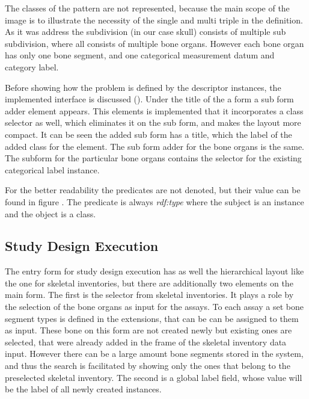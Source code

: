 
The classes of the pattern are not represented, because the main scope of the image is to illustrate the necessity of the single and multi triple in the definition. As it was address the subdivision (in our case skull) consists of multiple sub subdivision, where all consists of multiple bone organs. However each bone organ has only one bone segment, and one categorical measurement datum and category label.

Before showing how the problem is defined by the descriptor instances, the implemented interface is discussed (). Under the title of the a form a sub form adder element appears. This elements is implemented that it incorporates a class selector as well, which eliminates it on the sub form, and makes the layout more compact. It can be seen the added sub form has a title, which the label of the added class for the element. The sub form adder for the bone organs is the same. The subform for the particular bone organs contains the selector for the existing categorical label instance. 



For the better readability the predicates are not denoted, but their value can be found in figure . The predicate is always \textit{rdf:type} where the subject is an instance and the object is a class.  





\subsection{Study Design Execution} \label{43}


The entry form for study design execution has as well the hierarchical layout like the one for skeletal inventories, but there are additionally two elements on the main form. The first is the selector from skeletal inventories. It plays a role by the selection of the bone organs as input for the assays. To each assay a set bone segment types is defined in the extensions, that can be can be assigned to them as input. These bone on this form are not created newly but existing ones are selected, that were already added in the frame of the skeletal inventory data input.  However there can be a large amount bone segments stored in the system, and thus the search is facilitated by showing only the ones that belong to the preselected skeletal inventory. The second is a global label field, whose value will be the label of all newly created instances.




